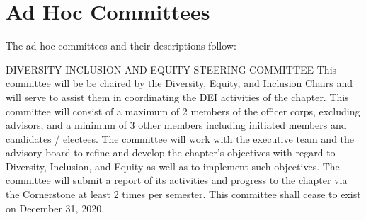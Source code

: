 \section{Ad Hoc Committees}\label{sec:AdHocCommittees} The ad hoc committees and their descriptions follow:\\
\begin{enumsubsection}


\item{DIVERSITY INCLUSION AND EQUITY STEERING COMMITTEE}  This committee will be be chaired by the Diversity, Equity, and Inclusion Chairs and will serve to assist them in coordinating the DEI activities of the chapter. This committee will consist of a maximum of 2 members of the officer corps, excluding advisors, and a minimum of 3 other members including initiated members and candidates / electees. The committee will work with the executive team and the advisory board to refine and develop the chapter's objectives with regard to Diversity, Inclusion, and Equity as well as to implement such objectives. The committee will submit a report of its activities and progress to the chapter via the Cornerstone at least 2 times per semester. This committee shall cease to exist on December 31, 2020.








\end{enumsubsection}
